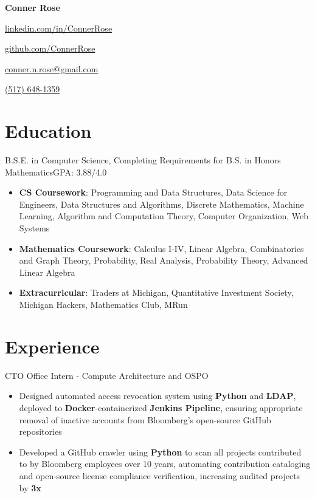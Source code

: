 \documentclass[letterpaper,11pt]{article}
\begin{document}
\begin{center}
    \Huge{\textbf{Conner Rose}}

    \begin{itemize*}
        \item[] \href{https://linkedin.com/in/ConnerRose}{linkedin.com/in/ConnerRose}
        \item \href{https://github.com/ConnerRose}{github.com/ConnerRose}
        \item \href{mailto:conner.n.rose@gmail.com}{conner.n.rose@gmail.com}
        \item \href{tel:+15176481359}{(517) 648-1359}
    \end{itemize*}
\end{center}

\section{Education}
{B.S.E. in Computer Science, Completing Requirements for B.S. in Honors Mathematics}{GPA: 3.88/4.0}
\begin{itemize}
    \item \textbf{CS Coursework}: Programming and Data Structures, Data Science for
          Engineers, Data Structures and Algorithms, Discrete Mathematics, Machine
          Learning, Algorithm and Computation Theory, Computer Organization, Web Systems
    \item \textbf{Mathematics Coursework}: Calculus I-IV, Linear Algebra, Combinatorics
          and Graph Theory, Probability, Real Analysis, Probability Theory, Advanced
          Linear Algebra
    \item \textbf{Extracurricular}: Traders at Michigan, Quantitative Investment Society,
          Michigan Hackers, Mathematics Club, MRun
\end{itemize}

\section{Experience}
{CTO Office Intern - Compute Architecture and OSPO}{}
\begin{itemize}
    \item Designed automated access revocation system using \textbf{Python} and
          \textbf{LDAP}, deployed to \textbf{Docker}-containerized \textbf{Jenkins
              Pipeline}, ensuring appropriate removal of inactive accounts from Bloomberg's
          open-source GitHub repositories
    \item Developed a GitHub crawler using \textbf{Python} to scan all projects
          contributed to by Bloomberg employees over 10 years, automating contribution
          cataloging and open-source license compliance verification, increasing audited
          projects by \textbf{3x}
\end{itemize}
\end{document}
